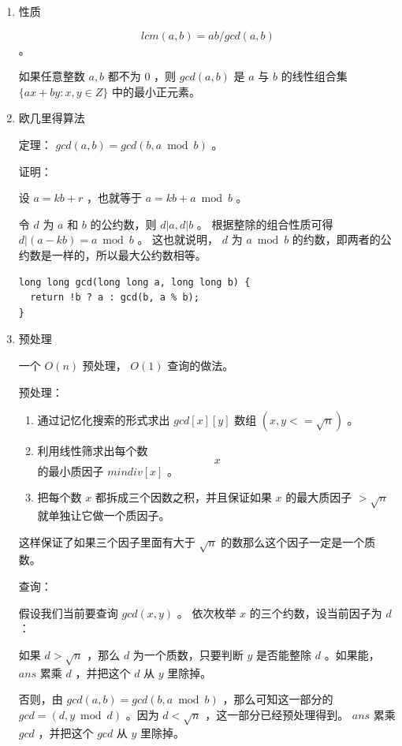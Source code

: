 \documentclass[11pt]{article}
\begin{document}
\begin{enumerate}
\item 性质
\label{sec-3-3-1-1}

$$lcm(a,b) = ab/gcd(a,b)$$。

如果任意整数 $a,b$ 都不为 $0$  ，则 $gcd(a,b)$ 是 $a$ 与 $b$ 的线性组合集 $\{ax+by:x,y \in Z\}$ 中的最小正元素。

\item 欧几里得算法
\label{sec-3-3-1-2}

定理： $gcd(a, b) = gcd(b, a \bmod b)$ 。

证明：

设 $a = kb + r$  ，也就等于 $a = kb + a \bmod b$  。

令 $d$ 为 $a$ 和 $b$ 的公约数，则 $d|a,d|b$ 。 根据整除的组合性质可得 $d|(a-kb)=a \bmod b$  。
这也就说明， $d$ 为 $a \bmod b$ 的约数，即两者的公约数是一样的，所以最大公约数相等。

\begin{verbatim}
long long gcd(long long a, long long b) {
  return !b ? a : gcd(b, a % b);
}
\end{verbatim}

\item 预处理
\label{sec-3-3-1-3}

一个 $O(n)$ 预处理， $O(1)$ 查询的做法。

预处理：

\begin{enumerate}
\item 通过记忆化搜索的形式求出 $gcd[x][y]$ 数组 $(x,y<= \sqrt{n})$ 。

\item 利用线性筛求出每个数$$x$$的最小质因子 $mindiv[x]$ 。

\item 把每个数 $x$ 都拆成三个因数之积，并且保证如果 $x$ 的最大质因子 $> \sqrt{n}$ 就单独让它做一个质因子。
\end{enumerate}

这样保证了如果三个因子里面有大于 $\sqrt{n}$ 的数那么这个因子一定是一个质数。

查询：

假设我们当前要查询 $gcd(x,y)$ 。 依次枚举 $x$ 的三个约数，设当前因子为 $d$  ：

如果 $d>\sqrt{n}$ ，那么 $d$ 为一个质数，只要判断 $y$ 是否能整除 $d$ 。如果能， $ans$ 累乘 $d$ ，并把这个 $d$ 从 $y$ 里除掉。

否则，由 $gcd(a,b)=gcd(b,a \bmod b)$ ，那么可知这一部分的 $gcd=(d,y \bmod d)$ 。因为 $d<\sqrt{n}$ ，这一部分已经预处理得到。 $ans$ 累乘 $gcd$ ，并把这个 $gcd$ 从 $y$ 里除掉。


\end{enumerate}
\end{document}
